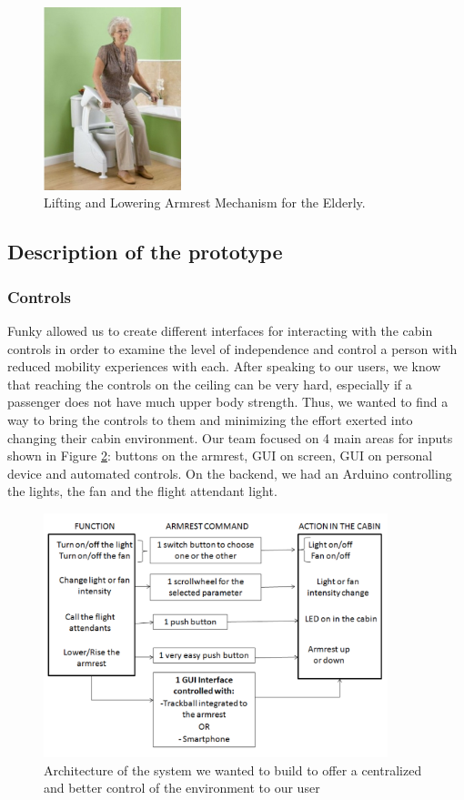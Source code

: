 \begin{figure}[h]
  \centering
     \includegraphics[width=4cm]{images/AssistiveArmrest.jpg}
   \caption{ Lifting and Lowering Armrest Mechanism for the Elderly. \cite{toilet}}
  \label{fig:AssistiveArmrests.jpg}
\end{figure}


\subsection{Description of the prototype}


\subsubsection{Controls}

Funky allowed us to create different interfaces for interacting with the cabin controls in order to examine the level of independence and control a person with reduced mobility experiences with each. After speaking to our users, we know that reaching the controls on the ceiling can be very hard, especially if a passenger does not have much upper body strength. Thus, we wanted to find a way to bring the controls to them and minimizing the effort exerted into changing their cabin environment.  Our team focused on 4 main areas for inputs shown in Figure \ref{fig:ControlArchitecture.jpg}: buttons on the armrest, GUI on screen, GUI on personal device and automated controls.  On the backend, we had an Arduino controlling the lights, the fan and the flight attendant light. 


\begin{figure}[h]
  \centering
     \includegraphics[width=10cm]{images/ControlArchitecture.jpg}
   \caption{Architecture of the system we wanted to build to offer a centralized and better control of the environment to our user}
  \label{fig:ControlArchitecture.jpg}
\end{figure}

